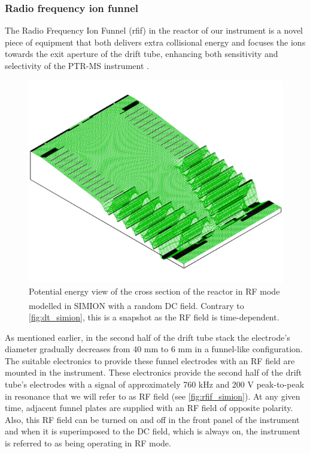 \subsubsection{Radio frequency ion funnel}\label{section:rfif}
The Radio Frequency Ion Funnel (\acrshort{rfif}) in the reactor of our instrument is a novel piece of equipment %
that both delivers extra collisional energy and focuses the ions towards the exit aperture of the drift tube, enhancing both sensitivity and selectivity of the PTR-MS instrument \cite{RF_TNT,barber2012increased}.

\begin{figure}[t]
\centering
\includegraphics[width=0.6\linewidth]{pics/RF_SIMION.png}
\caption[Potential energy view of the cross section of the reactor in RF mode modelled in SIMION\textsuperscript{\textregistered} with a random DC field.]{Potential energy view of the cross section of the reactor in RF mode modelled in SIMION\textsuperscript{\textregistered} with a random DC field. Contrary to \autoref{fig:dt_simion}, this is a snapshot as the RF field is time-dependent.}
\label{fig:rfif_simion}
\end{figure}
%
%
As mentioned  earlier, in the second half of the drift tube stack the electrode's diameter gradually decreases from 40 mm to 6 mm in a funnel-like configuration. The suitable electronics to provide these funnel electrodes with an RF field are mounted in the instrument. These electronics
provide the second half of the drift tube's electrodes with a signal of approximately 760 kHz and 200 V peak-to-peak in resonance that we will refer to as RF field (see \autoref{fig:rfif_simion}). At any given time, adjacent funnel plates are supplied with an RF field of opposite polarity. Also, this RF field can be turned on and off in the front panel of the instrument and when it is superimposed to the DC field, which is always on, the instrument is referred to as being operating in RF mode.
